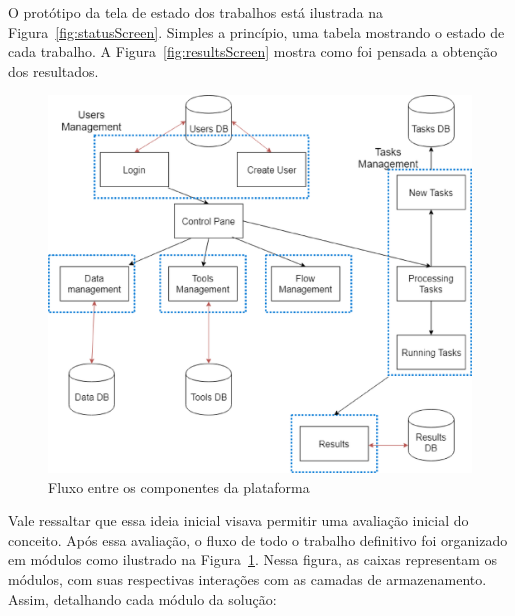 \documentclass[11pt,twoside]{article}
\begin{document}
O protótipo da tela de estado dos trabalhos está ilustrada na Figura~\ref{fig:statusScreen}. Simples a princípio, uma tabela mostrando o estado de cada trabalho. A Figura~\ref{fig:resultsScreen} mostra como foi pensada a obtenção dos resultados.

\begin{figure}[!h]
  \centering
  \includegraphics[scale=0.4]{comp_flow.eps}
  \caption{Fluxo entre os componentes da plataforma}
  \label{fig:flowScreen}
\end{figure}

Vale ressaltar que essa ideia inicial visava permitir uma avaliação inicial do conceito. Após essa avaliação, o fluxo de todo o trabalho definitivo foi 
organizado em módulos como ilustrado na Figura~\ref{fig:flowScreen}. Nessa figura, as caixas representam os módulos, com suas respectivas interações com 
as camadas de armazenamento. Assim, detalhando cada módulo da solução:
\end{document}

